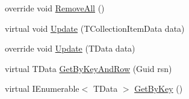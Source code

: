 \begin{DoxyCompactItemize}
\item 
override void \hyperlink{classCqrs_1_1Azure_1_1BlobStorage_1_1TableStorageStore_aadd66b35bfa105ef4446bd791e99a3d5}{Remove\+All} ()
\item 
virtual void \hyperlink{classCqrs_1_1Azure_1_1BlobStorage_1_1TableStorageStore_aacb673aed5c6f828917f4d2e8c2ff75b}{Update} (T\+Collection\+Item\+Data data)
\item 
override void \hyperlink{classCqrs_1_1Azure_1_1BlobStorage_1_1TableStorageStore_a869eba77358b10fc298f8e13fb21d628}{Update} (T\+Data data)
\item 
virtual T\+Data \hyperlink{classCqrs_1_1Azure_1_1BlobStorage_1_1TableStorageStore_ab7c4ae1a7b13e6bd1c36c242b753edba}{Get\+By\+Key\+And\+Row} (Guid rsn)
\item 
virtual I\+Enumerable$<$ T\+Data $>$ \hyperlink{classCqrs_1_1Azure_1_1BlobStorage_1_1TableStorageStore_a7a6e253d7d4f6d40a2b59e804f68c5c4}{Get\+By\+Key} ()
\end{DoxyCompactItemize}
